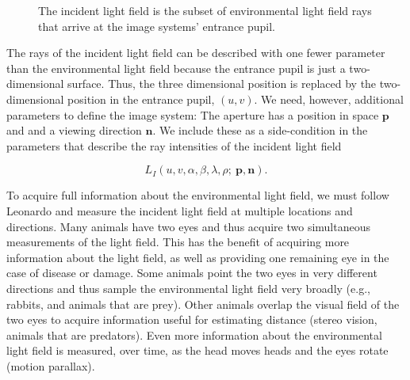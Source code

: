 \documentclass[
  letterpaper,
]{book}
\begin{document}
\begin{figure}


\caption{\label{fig-incident-lightfield}The incident light field is the
subset of environmental light field rays that arrive at the image
systems' entrance pupil.}

\end{figure}%

The rays of the incident light field can be described with one fewer
parameter than the environmental light field because the entrance pupil
is just a two-dimensional surface. Thus, the three dimensional position
is replaced by the two-dimensional position in the entrance pupil,
\((u,v)\). We need, however, additional parameters to define the image
system: The aperture has a position in space \(\mathbf{p}\) and and a
viewing direction \(\mathbf{n}\). We include these as a side-condition
in the parameters that describe the ray intensities of the incident
light field

\[
L_I(u,v,\alpha,\beta,\lambda,\rho; ~\mathbf{p},\mathbf{n}) .
\]

To acquire full information about the environmental light field, we must
follow Leonardo and measure the incident light field at multiple
locations and directions. Many animals have two eyes and thus acquire
two simultaneous measurements of the light field. This has the benefit
of acquiring more information about the light field, as well as
providing one remaining eye in the case of disease or damage. Some
animals point the two eyes in very different directions and thus sample
the environmental light field very broadly (e.g., rabbits, and animals
that are prey). Other animals overlap the visual field of the two eyes
to acquire information useful for estimating distance (stereo vision,
animals that are predators). Even more information about the
environmental light field is measured, over time, as the head moves
heads and the eyes rotate (motion parallax).
\end{document}
